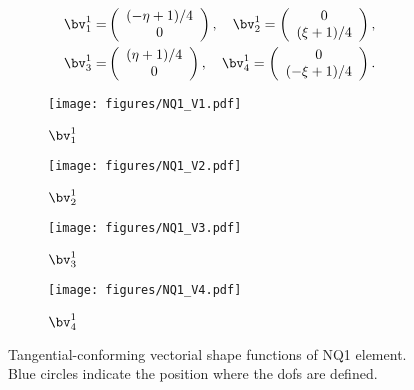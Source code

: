 \begin{equation}
\begin{aligned}
\bv_{1}^1 =&  \left( \begin{array}{c}
(-\eta + 1)/4 \\
0 
\end{array} \right), \quad 
\bv_{2}^1 =  \left( \begin{array}{c}
0 \\
 (\xi + 1)/4 
\end{array} \right) , \\
\bv_{3}^1 =&  \left( \begin{array}{c}
(\eta + 1)/4 \\
0
\end{array} \right) , \quad 
\bv_{4}^1 =  \left( \begin{array}{c}
0 \\
 (-\xi + 1)/4
\end{array}\right).
\end{aligned}
\end{equation}

\begin{figure}[ht]
    \centering
     \begin{subfigure}[b]{0.33\textwidth}
         \centering
         \texttt{[image: figures/NQ1\_V1.pdf]}
        \caption{$\bv_1^1$}
     \end{subfigure}
     \begin{subfigure}[b]{0.33\textwidth}
         \centering
         \texttt{[image: figures/NQ1\_V2.pdf]}
  \caption{$\bv_2^1$}
     \end{subfigure}
          \begin{subfigure}[b]{0.33\textwidth}
         \centering
         \texttt{[image: figures/NQ1\_V3.pdf]}
  \caption{$\bv_3^1$}
     \end{subfigure}
          \begin{subfigure}[b]{0.33\textwidth}
         \centering
         \texttt{[image: figures/NQ1\_V4.pdf]}
        \caption{$\bv_4^1$}
     \end{subfigure}
       \caption{Tangential-conforming vectorial shape functions of NQ1 element. Blue circles indicate the position where the dofs are defined. }
        \label{Fig:shape_function_NQ1}
\end{figure}

